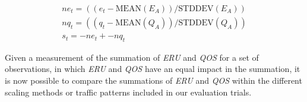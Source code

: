 \begin{align*}
  ne_{t} = ((e_{t} - \mbox{MEAN}(E_{A})) / \mbox{STDDEV}(E_{A})) \\
  nq_{t} = ((q_{t} - \mbox{MEAN}(Q_{A})) / \mbox{STDDEV}(Q_{A})) \\
  s_{t} = -ne_{t} + -nq_{t}
\end{align*}

Given a measurement of the summation of \textit{ERU} and \textit{QOS} for a set
of observations, in which \textit{ERU} and \textit{QOS} have an equal impact in
the summation, it is now possible to compare the summations of \textit{ERU} and
\textit{QOS} within the different scaling methods or traffic patterns included
in our evaluation trials.
